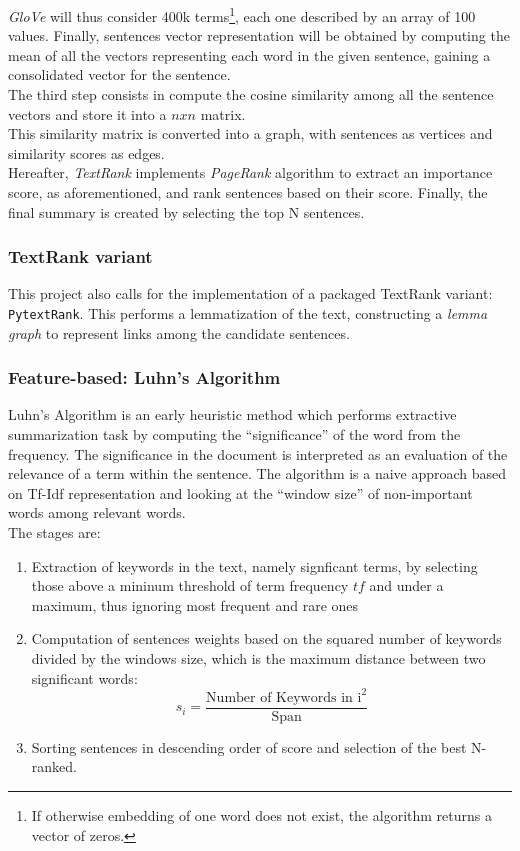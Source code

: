 \documentclass[fleqn,10pt]{SelfArx} %
\begin{document}
\textit{GloVe} will thus consider 400k terms\footnote{If otherwise embedding of one word does not exist, the algorithm returns a vector of zeros.}, each one described by an array of 100 values. Finally, sentences vector representation will be obtained by computing the mean of all the vectors representing each word in the given sentence, gaining a consolidated vector for the sentence.\\
The third step consists in compute the cosine similarity among all the sentence vectors and store it into a $nxn$ matrix.\\
This similarity matrix is converted into a graph, with sentences as vertices and similarity scores as edges.\\
Hereafter, \textit{TextRank} implements \textit{PageRank} algorithm to extract an importance score, as aforementioned, and rank sentences based on their score. Finally, the final summary is created by selecting the top N sentences.
\subsubsection{TextRank variant}
This project also calls for the implementation of a packaged TextRank variant: \texttt{PytextRank}. This performs a lemmatization of the text, constructing a \textit{lemma graph} to represent links among the candidate sentences.
\subsubsection{Feature-based: Luhn's Algorithm}
Luhn's Algorithm is an early heuristic method which performs extractive summarization task by computing the “significance” of the word from the frequency. The significance in the document is interpreted as an evaluation of the relevance of a term within the sentence. The algorithm is a naive approach based on Tf-Idf representation and looking at the “window size” of non-important words among relevant words.\\
The stages are:
\begin{enumerate}
  \item Extraction of keywords in the text, namely signficant terms, by selecting those above a mininum threshold of term frequency $tf$ and under a maximum, thus ignoring most frequent and rare ones 
  \item Computation of sentences weights based on the squared number of keywords divided by the windows size, which is the maximum distance between two significant words: $$s_i=\frac{\text{Number of Keywords in i}^2}{\text{Span}}$$
  \item Sorting sentences in descending order of score and selection of the best N-ranked.
\end{enumerate}
\end{document}
